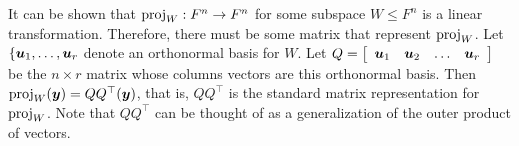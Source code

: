 
It can be shown that $\proj_W : F^n \to F^n$ for some subspace $W\le F^n$ is a linear transformation. Therefore, there must be some matrix that represent $\proj_W$. Let $\{\bb u_1, \ldots, \bb u_r$ denote an orthonormal basis for $W$. Let $Q = \mtx{cccc}{\bb u_1 & \bb u_2 &\ldots & \bb u_r}$ be the $n\times r$ matrix whose columns vectors are this orthonormal basis. Then $\proj_W(\bb y) = QQ^\top(\bb y)$, that is, $QQ^\top$ is the standard matrix representation for $\proj_W$. Note that $QQ^\top$ can be thought of as a generalization of the outer product of vectors. 


